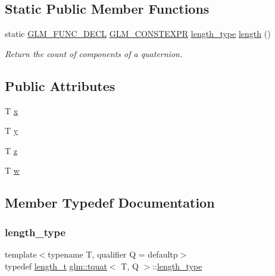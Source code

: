 \subsection*{Static Public Member Functions}
\begin{DoxyCompactItemize}
\item 
static \hyperlink{setup_8hpp_ab2d052de21a70539923e9bcbf6e83a51}{G\+L\+M\+\_\+\+F\+U\+N\+C\+\_\+\+D\+E\+CL} \hyperlink{setup_8hpp_a08b807947b47031d3a511f03f89645ad}{G\+L\+M\+\_\+\+C\+O\+N\+S\+T\+E\+X\+PR} \hyperlink{structglm_1_1tquat_a6d9ab28781d7835b30216a996484c026}{length\+\_\+type} \hyperlink{structglm_1_1tquat_a7cf19acd1bf11bdf0f52dbc16b3dee53}{length} ()
\begin{DoxyCompactList}\small\item\em Return the count of components of a quaternion. \end{DoxyCompactList}\end{DoxyCompactItemize}
\subsection*{Public Attributes}
\begin{DoxyCompactItemize}
\item 
T \hyperlink{structglm_1_1tquat_a74fac4f3deda35413106feeae734641c}{x}
\item 
T \hyperlink{structglm_1_1tquat_a09c876d49b2406fd50aca892f3637f0f}{y}
\item 
T \hyperlink{structglm_1_1tquat_a81cfe33795e56627715972ad533605d4}{z}
\item 
T \hyperlink{structglm_1_1tquat_a7e71715c0eb0b1cd8de24fc5012594bf}{w}
\end{DoxyCompactItemize}


\subsection{Member Typedef Documentation}
\mbox{\label{structglm_1_1tquat_a6d9ab28781d7835b30216a996484c026}} 
\subsubsection{\texorpdfstring{length\+\_\+type}{length\_type}}
{\footnotesize\ttfamily template$<$typename T, qualifier Q = defaultp$>$ \\
typedef \hyperlink{namespaceglm_a090a0de2260835bee80e71a702492ed9}{length\+\_\+t} \hyperlink{structglm_1_1tquat}{glm\+::tquat}$<$ T, Q $>$\+::\hyperlink{structglm_1_1tquat_a6d9ab28781d7835b30216a996484c026}{length\+\_\+type}}

